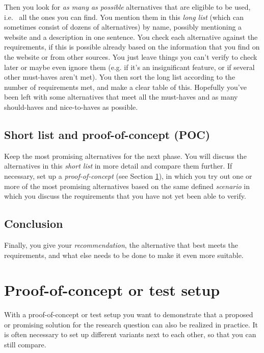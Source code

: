 Then you look for \emph{as many as possible} alternatives that are eligible to be used, i.e. ~all the ones you can find. You mention them in this \emph{long list} (which can sometimes consist of dozens of alternatives) by name, possibly mentioning a website and a description in one sentence. You check each alternative against the requirements, if this is possible already based on the information that you find on the website or from other sources. You just leave things you can't verify to check later or maybe even ignore them (e.g. if it's an insignificant feature, or if several other must-haves aren't met). You then sort the long list according to the number of requirements met, and make a clear table of this. Hopefully you've been left with some alternatives that meet all the must-haves and as many should-haves and nice-to-haves as possible.

\subsection{Short list and proof-of-concept (POC)}
\label{ssec:short-list-poc}

Keep the most promising alternatives for the next phase. You will discuss the alternatives in this \emph{short list} in more detail and compare them further. If necessary, set up a \emph{proof-of-concept} (see Section \ref{sec:poctestsetup}), in which you try out one or more of the most promising alternatives based on the same defined \emph{scenario} in which you discuss the requirements that you have not yet been able to verify.

\subsection{Conclusion}
\label{ssec:comparativestudyconclusion}

Finally, you give your \emph{recommendation}, the alternative that best meets the requirements, and what else needs to be done to make it even more suitable.

\section{Proof-of-concept or test setup}
\label{sec:poctestsetup}

With a proof-of-concept or test setup you want to demonstrate that a proposed or promising solution for the research question can also be realized in practice. It is often necessary to set up different variants next to each other, so that you can still compare.

